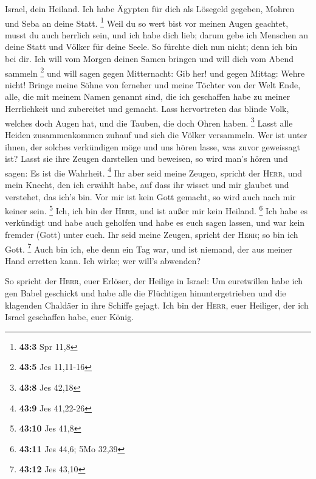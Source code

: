 Israel, dein Heiland. Ich habe Ägypten für dich als Lösegeld gegeben,
Mohren und Seba an deine Statt. \footnote{\textbf{43:3} Spr 11,8}
 Weil du so wert bist vor meinen Augen geachtet, musst du
auch herrlich sein, und ich habe dich lieb; darum gebe ich Menschen an
deine Statt und Völker für deine Seele.  So fürchte dich
nun nicht; denn ich bin bei dir. Ich will vom Morgen deinen Samen
bringen und will dich vom Abend sammeln \footnote{\textbf{43:5} Jes
  11,11-16}  und will sagen gegen Mitternacht: Gib her!
und gegen Mittag: Wehre nicht! Bringe meine Söhne von ferneher und meine
Töchter von der Welt Ende,  alle, die mit meinem Namen
genannt sind, die ich geschaffen habe zu meiner Herrlichkeit und
zubereitet und gemacht.  Lass hervortreten das blinde
Volk, welches doch Augen hat, und die Tauben, die doch Ohren haben.
\footnote{\textbf{43:8} Jes 42,18}  Lasst alle Heiden
zusammenkommen zuhauf und sich die Völker versammeln. Wer ist unter
ihnen, der solches verkündigen möge und uns hören lasse, was zuvor
geweissagt ist? Lasst sie ihre Zeugen darstellen und beweisen, so wird
man's hören und sagen: Es ist die Wahrheit. \footnote{\textbf{43:9} Jes
  41,22-26}  Ihr aber seid meine Zeugen, spricht der
\textsc{Herr}, und mein Knecht, den ich erwählt habe, auf dass ihr
wisset und mir glaubet und verstehet, das ich's bin. Vor mir ist kein
Gott gemacht, so wird auch nach mir keiner sein. \footnote{\textbf{43:10}
  Jes 41,8}  Ich, ich bin der \textsc{Herr}, und ist
außer mir kein Heiland. \footnote{\textbf{43:11} Jes 44,6; 5Mo 32,39}
 Ich habe es verkündigt und habe auch geholfen und habe
es euch sagen lassen, und war kein fremder (Gott) unter euch. Ihr seid
meine Zeugen, spricht der \textsc{Herr}; so bin ich Gott. \footnote{\textbf{43:12}
  Jes 43,10}  Auch bin ich, ehe denn ein Tag war, und ist
niemand, der aus meiner Hand erretten kann. Ich wirke; wer will's
abwenden?

 So spricht der \textsc{Herr}, euer Erlöser, der Heilige
in Israel: Um euretwillen habe ich gen Babel geschickt und habe alle die
Flüchtigen hinuntergetrieben und die klagenden Chaldäer in ihre Schiffe
gejagt.  Ich bin der \textsc{Herr}, euer Heiliger, der
ich Israel geschaffen habe, euer König.

